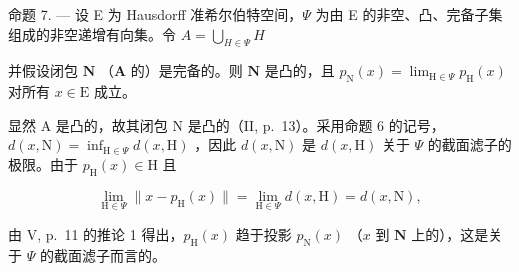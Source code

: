 命题 7. --- 设 E 为 Hausdorff 准希尔伯特空间，\(\Psi\) 为由 E 的非空、凸、完备子集组成的非空递增有向集。令 \(A = \bigcup_{H \in \Psi} H\)

并假设闭包 \(\mathbf{N}\) （\(\mathbf{A}\) 的）是完备的。则 \(\mathbf{N}\) 是凸的，且 \(p_{\mathrm{N}}(x) = \lim_{\mathrm{H}\in \Psi}p_{\mathrm{H}}(x)\) 对所有 \(x\in \mathrm{E}\) 成立。

显然 A 是凸的，故其闭包 N 是凸的（II, p.~13）。采用命题 6 的记号，\(d(x, \mathrm{N}) = \inf_{\mathrm{H} \in \Psi} d(x, \mathrm{H})\) ，因此 \(d(x, \mathrm{N})\) 是 \(d(x, \mathrm{H})\) 关于 \(\Psi\) 的截面滤子的极限。由于 \(p_{\mathrm{H}}(x) \in \mathrm{H}\) 且

\[
\lim _ {\mathrm{H} \in \Psi} \| x - p _ {\mathrm{H}} (x) \| = \lim _ {\mathrm{H} \in \Psi} d (x, \mathrm{H}) = d (x, \mathrm{N}),
\]

由 V, p.~11 的推论 1 得出，\(p_{\mathrm{H}}(x)\) 趋于投影 \(p_{\mathrm{N}}(x)\) （\(x\) 到 \(\mathbf{N}\) 上的），这是关于 \(\Psi\) 的截面滤子而言的。

